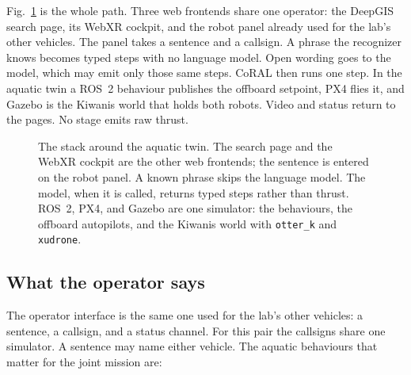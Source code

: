 \documentclass[conference]{IEEEtran}
\def\CoRAL{CoRAL}
\def\otterk{\texttt{otter\_k}}
\def\xudrone{\texttt{xudrone}}
\begin{document}
Fig.~\ref{fig:stack} is the whole path. Three web frontends share one operator: the DeepGIS search page, its WebXR cockpit, and the robot panel already used for the lab's other vehicles. The panel takes a sentence and a callsign. A phrase the recognizer knows becomes typed steps with no language model. Open wording goes to the model, which may emit only those same steps. \CoRAL{} then runs one step. In the aquatic twin a ROS~2 behaviour publishes the offboard setpoint, PX4 flies it, and Gazebo is the Kiwanis world that holds both robots. Video and status return to the pages. No stage emits raw thrust.

\begin{figure}[t]
\centering
{}
\caption{The stack around the aquatic twin. The search page and the WebXR cockpit are the other web frontends; the sentence is entered on the robot panel. A known phrase skips the language model. The model, when it is called, returns typed steps rather than thrust. ROS~2, PX4, and Gazebo are one simulator: the behaviours, the offboard autopilots, and the Kiwanis world with \otterk{} and \xudrone{}.}
\label{fig:stack}
\end{figure}

\subsection{What the operator says}
The operator interface is the same one used for the lab's other vehicles: a sentence, a callsign, and a status channel. For this pair the callsigns share one simulator. A sentence may name either vehicle. The aquatic behaviours that matter for the joint mission are:
\end{document}
